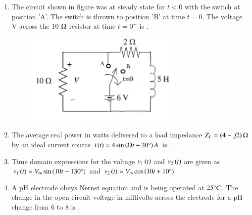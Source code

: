 \documentclass[journal,12pt,onecolumn]{IEEEtran}
\theoremstyle{remark}
\begin{document}
\begin{enumerate}
    \item The circuit shown in figure was at steady state for $t < 0$ with the switch at position 'A'. The switch is thrown to position 'B' at time $t = 0$. The voltage V  across the 10 $\ohm$ resistor at time $t=0^+$ is \underline{\hspace{2cm}}.
    \begin{figure}[H]
        \centering
        \includegraphics[width=0.4\columnwidth]{q6}
        \caption*{}
        \label{Q6}
    \end{figure}

    \hfill{}

    \item The average real power in watts delivered to a load impedance $Z_L = \left(4 - j2\right)\ohm$ by an ideal current source $i\left(t\right) = 4 \sin\left(\ohm t + 20\degree\right) A$ is \underline{\hspace{2cm}}.

    \hfill{}

    
    
    \item Time domain expressions for the voltage $v_1\left(t\right)$ and $v_2\left(t\right)$ are given as $v_1\left(t\right) = V_m \sin\left(10t - 130\degree\right)$ and $v_2\left(t\right) = V_m \cos\left(10t + 10\degree\right)$.
    
    \hfill{}
        \begin{enumerate}
        \end{enumerate}

    \item A pH electrode obeys Nernst equation and is being operated at $25\degree C$. The change in the open circuit voltage in millivolts across the electrode for a pH change from 6 to 8 is \underline{\hspace{2cm}}.


\end{enumerate}
\end{document}
